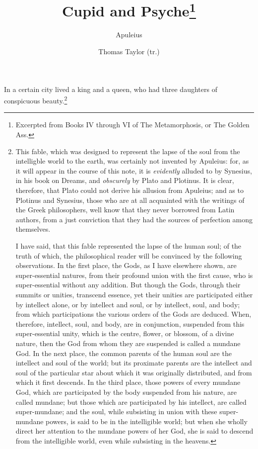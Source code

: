 \documentclass{article}
\title{Cupid and Psyche\footnote{Excerpted from Books IV through VI of The
Metamorphosis, or The Golden Ass.}}
\author{Apuleius \and Thomas Taylor (tr.)}
\date{}
\begin{document}
\maketitle

\noindent In a certain city lived a king and a queen, who had three daughters
of conspicuous beauty.\footnote{This fable, which was designed to represent the
lapse of the soul from the intelligble world to the earth, was certainly not
invented by Apuleius: for, as it will appear in the course of this note, it is
\textit{evidently} alluded to by Synesius, in his book on Dreams, and
\textit{obscurely} by Plato and Plotinus. It is clear, therefore, that Plato
could not derive his allusion from Apuleius; and as to Plotinus and Synesius,
those who are at all acquainted with the writings of the Greek philosophers,
well know that they never borrowed from Latin authors, from a just conviction
that they had the sources of perfection among themselves.

I have said, that this fable represented the lapse of the human soul; of the
truth of which, the philosophical reader will be convinced by the following
observations. In the first place, the Gods, as I have elsewhere shown, are
super-essential natures, from their profound union with the first cause, who is
super-essential without any addition. But though the Gods, through their
summits or unities, transcend essence, yet their unities are participated
either by intellect alone, or by intellect and soul, or by intellect, soul, and
body; from which participations the various orders of the Gods are deduced.
When, therefore, intellect, soul, and body, are in conjunction, suspended from
this super-essential unity, which is the centre, flower, or blossom, of a
divine nature, then the God from whom they are suspended is called a mundane
God. In the next place, the common parents of the human soul are the intellect
and soul of the world; but its proximate parents are the intellect and soul of
the particular star about which it was originally distributed, and from which
it first descends. In the third place, those powers of every mundane God, which
are participated by the body suspended from his nature, are called mundane; but
those which are participated by his intellect, are called super-mundane; and
the soul, while subsisting in union with these super-mundane powers, is said to
be in the intelligible world; but when she wholly direct her attention to the
mundane powers of her God, she is said to descend from the intelligible world,
even while subsisting in the heavens.

}
\end{document}
